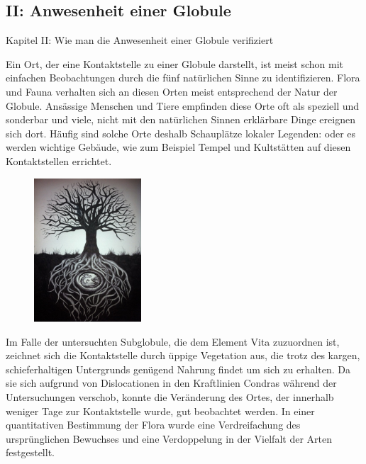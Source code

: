\documentclass[a5paper,8pt]{book}
\begin{document}
\newpage

\subsection{II: Anwesenheit einer Globule}

Kapitel II: Wie man die Anwesenheit einer Globule verifiziert

Ein Ort, der eine Kontaktstelle zu einer Globule darstellt, ist meist schon mit einfachen Beobachtungen durch die fünf 
natürlichen Sinne zu identifizieren. Flora und Fauna verhalten sich an diesen Orten meist entsprechend der Natur der 
Globule. Ansässige Menschen und Tiere empfinden diese Orte oft als speziell und sonderbar und viele, nicht mit den 
natürlichen Sinnen erklärbare Dinge ereignen sich dort. Häufig sind solche Orte deshalb Schauplätze lokaler Legenden: 
oder es werden wichtige Gebäude, wie zum Beispiel Tempel und Kultstätten auf diesen Kontaktstellen errichtet.

\begin{figure}
     \centering
	\includegraphics[width=4cm]{pictures/drachenbaum.jpg}
\end{figure}

Im Falle der untersuchten Subglobule, die dem Element Vita zuzuordnen ist, zeichnet sich die Kontaktstelle durch üppige 
Vegetation aus, die trotz des kargen, schieferhaltigen Untergrunds genügend Nahrung findet um sich zu erhalten. Da sie 
sich aufgrund von Dislocationen in den Kraftlinien Condras während der Untersuchungen verschob, konnte die Veränderung 
des Ortes, der innerhalb weniger Tage zur Kontaktstelle wurde, gut beobachtet werden. In einer quantitativen Bestimmung 
der Flora wurde eine Verdreifachung des ursprünglichen Bewuchses und eine Verdoppelung in der Vielfalt der Arten 
festgestellt.
\end{document}
